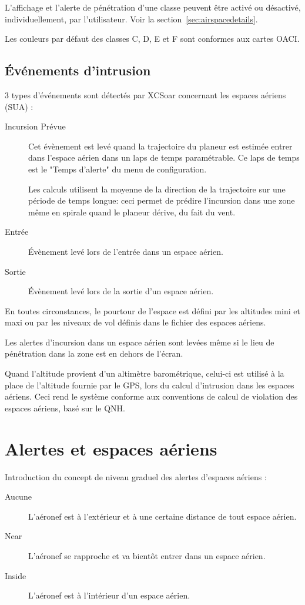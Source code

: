 L'affichage et l'alerte de pénétration d'une classe peuvent être activé ou désactivé, individuellement, par l'utilisateur. Voir la section~\ref{sec:airspacedetails}.

Les couleurs par défaut des classes C, D, E et F sont conformes aux cartes OACI.


\subsection*{Événements d'intrusion}

3 types d'événements sont détectés par XCSoar concernant les espaces aériens (SUA) :
\begin{description}
\item[Incursion Prévue] Cet évènement est levé quand la trajectoire du planeur est estimée entrer dans l'espace aérien dans un laps de temps paramétrable. Ce laps de temps est le "Temps d'alerte" du menu de configuration.

Les calculs utilisent la moyenne de la direction de la trajectoire sur une période de temps longue: ceci permet de prédire l'incursion dans une zone même en spirale quand le planeur dérive, du fait du vent.



\item[Entrée] Évènement levé lors de l'entrée dans un espace aérien.
\item[Sortie] Évènement levé lors de la sortie d'un espace aérien.
\end{description}
En toutes circonstances, le pourtour de l'espace est défini par les altitudes mini et maxi ou par les niveaux de vol définis dans le fichier des espaces aériens.

Les alertes d'incursion dans un espace aérien sont levées même si le lieu de pénétration dans la zone est en dehors de l'écran.

Quand l'altitude provient d'un altimètre barométrique, celui-ci est utilisé à la place de l'altitude fournie par le GPS, lors du calcul d'intrusion dans les espaces aériens. Ceci rend le système conforme aux conventions de calcul de violation des espaces aériens, basé sur le QNH.

\section{Alertes et espaces aériens}

Introduction du concept de niveau graduel des alertes d'espaces aériens :
\begin{description}
\item[Aucune] L'aéronef est à l'extérieur et à une certaine distance de tout espace aérien.
\item[\colorbox{AirspaceYellow}{Near}] L'aéronef se rapproche et va bientôt entrer dans un espace aérien.
\item[\colorbox{AirspaceRed}{Inside}] L'aéronef est à l'intérieur d'un espace aérien.
\end{description}

